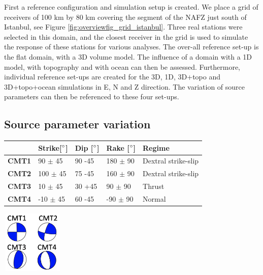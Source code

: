 \documentclass[../Text/00main.tex]{subfiles}
\begin{document}
First a reference configuration and simulation setup is created. We place a grid of receivers of 100 km by 80 km covering the segment of the NAFZ just south of Istanbul, see Figure \ref{fig:overviewfig_grid_istanbul}. Three real stations were selected in this domain, and the closest receiver in the grid is used to simulate the response of these stations for various analyses. The over-all reference set-up is the flat domain, with a 3D volume model. The influence of a domain with a 1D model, with topography and with ocean can then be assessed. Furthermore, individual reference set-ups are created for the 3D, 1D, 3D+topo and 3D+topo+ocean simulations in E, N and Z direction. The variation of source parameters can then be referenced to these four set-ups. 

\subsection{Source parameter variation}


\begin{table}[ht]
\footnotesize
\begin{minipage}[b]{0.4\textwidth}
    \centering
{}
\begin{tabular}{@{}l|llll@{}}
\toprule
 & \textbf{Strike{[$\degree$]}} & \textbf{Dip [$\degree$]} & \textbf{Rake [$\degree$]} & \textbf{Regime} \\ \midrule
\textbf{CMT1} & 90  $\pm$ 45 & 90 -45 & 180 $\pm$ 90 & Dextral strike-slip \\
\textbf{CMT2} & 100 $\pm$ 45 & 75 -45 & 160 $\pm$ 90 & Dextral strike-slip \\
\textbf{CMT3} & 10 $\pm$ 45  & 30 +45 & 90 $\pm$ 90  & Thrust              \\
\textbf{CMT4} & -10 $\pm$ 45 & 60 -45 & -90 $\pm$ 90 & Normal              \\ \bottomrule
\end{tabular}
\label{tab:CMTstarts}
\end{minipage}
\end{table}
\begin{minipage}[b]{0.3\textwidth}%

\centering
    \includegraphics[width=30mm, height=30mm]{images_methods/cmtnextto.png}
\label{fig:figure}
\end{minipage}
\end{document}
